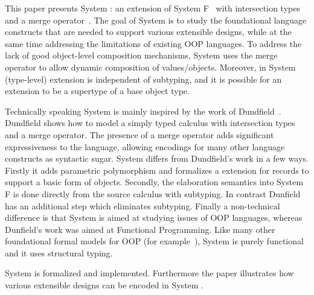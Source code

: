 \begin{comment}
Motivated by the insights gained in previous work, this paper presents 
a minimal core calculus that addresses current limitations and
provides a better foundational model for statically typed
delegation-based OOP? We show that Object Algebras fit nicely in this
model. 
\end{comment}

This paper presents System \name: an extension of System F~\cite{}
with intersection types and a merge operator~\cite{}.  
The goal of System \name is to study the foundational language
constructs that are needed to support various extensible designs,
while at the same time addressing the limitations of existing OOP
languages. To address the lack of good object-level composition
mechanisms, System \name uses the merge operator to allow dynamic
composition of values/objects. Moreover, in System \name (type-level)
extension is independent of subtyping, and it is possible for an
extension to be a supertype of a base object type.

Technically speaking System \name is mainly inspired by the work of
Dundfield~\cite{}.  Dundfield shows how to model a simply typed
calculus with intersection types and a merge operator. The presence of
a merge operator adds significant expressiveness to the language,
allowing encodings for many other language constructs as syntactic
sugar. System \name differs from Dundfield's work in a few
ways. Firstly it adds parametric polymorphism and formalizes a
extension for records to support a basic form of objects. Secondly,
the elaboration semantics into System F is done directly from the
source calculus with subtyping. In contrast Dunfield has an additional
step which eliminates subtyping.  Finally a non-technical difference
is that System \name is aimed at studying issues of OOP languages,
whereas Dunfield's work was aimed at Functional Programming.  Like
many other foundational formal models for OOP (for example~\cite{}),
System \name is purely functional and it uses structural typing. 

System \name is
formalized and implemented. Furthermore the paper illustrates how
various extensible designs can be encoded in System \name.

